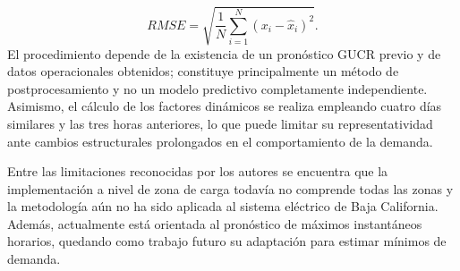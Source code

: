 \begin{equation}
RMSE =
\sqrt{
\frac{1}{N}
\sum_{i=1}^{N}
(x_i-\hat{x}_i)^2
}.
\end{equation}
El procedimiento depende de la existencia de un
pronóstico GUCR previo y de datos operacionales obtenidos; constituye principalmente un método de
postprocesamiento y no un modelo predictivo completamente
independiente. Asimismo, el cálculo de los factores dinámicos se
realiza empleando cuatro días similares y las tres horas anteriores,
lo que puede limitar su representatividad ante cambios estructurales
prolongados en el comportamiento de la demanda.

Entre las limitaciones reconocidas por los autores se encuentra que
la implementación a nivel de zona de carga todavía no comprende todas las zonas y  la metodología aún no ha sido aplicada al
sistema eléctrico de Baja California. Además, actualmente está
orientada al pronóstico de máximos instantáneos horarios, quedando
como trabajo futuro su adaptación para estimar mínimos de demanda.
\cite{CondeLopez2026}
